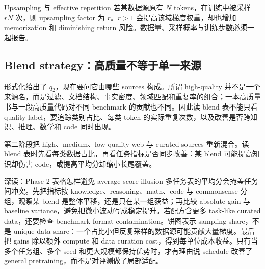 
\begin{knowledgebox}{Upsampling 与 effective repetition}
若某数据源原有 $N$ tokens，在训练中被采样 $rN$ 次，则 upsampling factor 为 $r$。$r>1$ 会提高该域梯度权重，却也增加 memorization 和 diminishing return 风险。数据量、采样概率与训练步数必须一起报告。
\end{knowledgebox}

\subsection{Blend strategy：高质量不等于单一来源}

形式化给出了 $q_2$，现在要问它由哪些 sources 构成。所谓 high-quality 并不是一个来源名，而是过滤、文档结构、事实密度、领域匹配和重复率的组合；一本高质量书与一段高质量代码对不同 benchmark 的贡献也不同。因此读 blend 表不能只看 quality label，要追踪类别占比、每类 token 的实际重复次数，以及改善是否跨知识、推理、数学和 code 同时出现。

第二阶段把 high、medium、low-quality web 与 curated sources 重新混合。读 blend 表时先看每类数据占比，再看任务指标是否同步改善：某 blend 可能提高知识却伤害 code，或提高平均分却缩小长尾覆盖。





\begin{knowledgebox}{深读：Phase-2 表格怎样避免 average-score illusion}
多任务表的平均分会掩盖任务间冲突。先把指标按 knowledge、reasoning、math、code 与 commonsense 分组，观察某 blend 是整体平移，还是只在某一组获益；再比较 absolute gain 与 baseline variance，避免把微小波动写成稳定提升。若配方含更多 task-like curated data，还要检查 benchmark format contamination。饼图表示 sampling share，不是 unique data share：一个占比小但反复采样的数据源可能贡献大量梯度。最后把 gains 除以额外 compute 和 data curation cost，得到每单位成本收益。只有当多个任务组、多个 seed 和更大规模都保持优势时，才有理由说 schedule 改善了 general pretraining，而不是对评测做了局部适配。
\end{knowledgebox}


